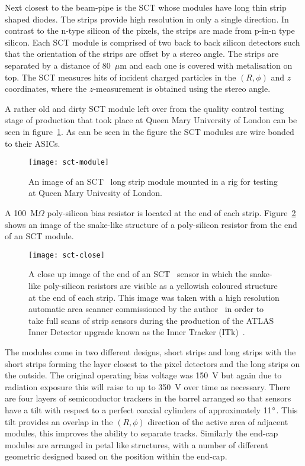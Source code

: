 Next closest to the beam-pipe is the SCT whose modules have long thin strip
shaped diodes. The strips provide high resolution in only a single direction. In
contrast to the n-type silicon of the pixels, the strips are made from p-in-n
type silicon. Each SCT module is comprised of two back to back silicon
detectors such that the orientation of the strips are offset by a stereo angle.
The strips are separated by a distance of 80~$\mu$m and each one is covered with
metalisation on top. The SCT measures hits of incident charged particles in the
$(R, \phi)$ and $z$ coordinates, where the $z$-measurement is obtained using the
stereo angle.

A rather old and dirty SCT module left over from the quality control testing
stage of production that took place at Queen Mary University of London can be
seen in figure~\ref{fig:strip-module}. As can be seen in the figure the SCT
modules are wire bonded to their ASICs.
\begin{figure}[ht]
  \centering
  \texttt{[image: sct-module]}
  \caption[ATLAS long strip module]{An image of an SCT~\cite{ATLAS-ID-TDR} long
    strip module mounted in a rig for testing at Queen Mary Univesity of
    London.}
  \label{fig:strip-module}
\end{figure}
A 100~M$\Omega$ poly-silicon bias resistor is located at the end of each strip.
Figure~\ref{fig:sct-close} shows an image of the snake-like structure of a
poly-silicon resistor from the end of an SCT module.
\begin{figure}[ht]
  \centering
  \texttt{[image: sct-close]}
  \caption[ATLAS strip close-up]{A close up image of the end of an
    SCT~\cite{ATLAS-ID-TDR} sensor in which the snake-like poly-silicon
    resistors are visible as a yellowish coloured structure at the end of each
    strip. This image was taken with a high resolution automatic area scanner
    commissioned by the author~\cite{itk-scanner} in order to take full scans of
    strip sensors during the production of the ATLAS Inner Detector upgrade
    known as the Inner Tracker (ITk)~\cite{itk-tdr, itk-strips-tdr}.}
  \label{fig:sct-close}
\end{figure}
The modules come in two different designs, short strips and long
strips with the short strips forming the layer closest to the pixel detectors
and the long strips on the outside. The original operating bias voltage was
150~V but again due to radiation exposure this will raise to up to 350~V over
time as necessary. There are four layers of semiconductor trackers in the barrel
arranged so that sensors have a tilt with respect to a perfect coaxial cylinders
of approximately 11$\degree$. This tilt provides an overlap in the $(R, \phi)$
direction of the active area of adjacent modules, this improves the ability to
separate tracks. Similarly the end-cap modules are arranged in petal like
structures, with a number of different geometric designed based on the position
within the end-cap.

